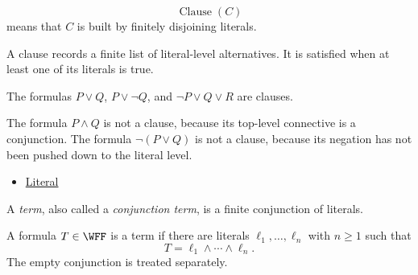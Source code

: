 \begin{remark*}
\[
\operatorname{Clause}(C)
\]
means that \(C\) is built by finitely disjoining literals.
\end{remark*}

\begin{remark*}[Interpretation]
A clause records a finite list of literal-level alternatives. It is satisfied
when at least one of its literals is true.
\end{remark*}

\begin{remark*}[Examples]
The formulas \(P\lor Q\), \(P\lor\neg Q\), and
\(\neg P\lor Q\lor R\) are clauses.
\end{remark*}

\begin{remark*}
The formula \(P\land Q\) is not a clause, because its top-level connective is a
conjunction. The formula \(\neg(P\lor Q)\) is not a clause, because its negation
has not been pushed down to the literal level.
\end{remark*}

\begin{dependencies}
\begin{itemize}
  \item \hyperref[def:literal-propositional-logic]{Literal}
\end{itemize}
\end{dependencies}

\begin{tcolorbox}[colback=propbox, colframe=propborder, arc=2pt,
  left=6pt, right=6pt, top=4pt, bottom=4pt,
  title={\small\textbf{Definition (Term)}},
  fonttitle=\small\bfseries]
\begin{definition}[Term]
\label{def:term-propositional-logic}
A \emph{term}, also called a \emph{conjunction term}, is a finite conjunction
of literals.
\end{definition}
\end{tcolorbox}

\begin{remark*}
A formula \(T\in\WFF\) is a term if there are literals
\(\ell_1,\ldots,\ell_n\) with \(n\ge 1\) such that
\[
T=\ell_1\land\cdots\land\ell_n.
\]
The empty conjunction is treated separately.
\end{remark*}


